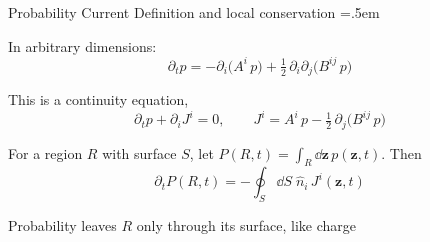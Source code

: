 \documentclass[xcolor={dvipsnames},t]{beamer}
\let\olditemize=\itemize
\let\endolditemize=\enditemize
\renewenvironment{itemize}{\olditemize \itemsep=.5em }{\endolditemize}
\begin{document}
\begin{frame}{Probability Current}
    \alert{Definition and local conservation}
    \begin{itemize}
        \item<2-> In arbitrary dimensions:
        \[ \partial_tp = -\partial_i\bigl(A^i\,p\bigr) + \tfrac12\,\partial_i\partial_j\bigl(B^{ij}\,p\bigr) \]
        \item<3-> This is a continuity equation,
        \[ \partial_tp + \partial_iJ^i = 0,\qquad J^i = A^i\,p - \tfrac12\,\partial_j\bigl(B^{ij}\,p\bigr) \]
        \item<4-> For a region $R$ with surface $S$, let $P(R,t)=\int_R\dd\bm z\,p(\bm z,t)$. Then
        \[ \partial_tP(R,t) = -\oint_S\dd S\;\hat n_i\,J^i(\bm z,t) \]
        \item<5-> Probability leaves $R$ only through its surface, like charge
    \end{itemize}
\end{frame}
\end{document}
